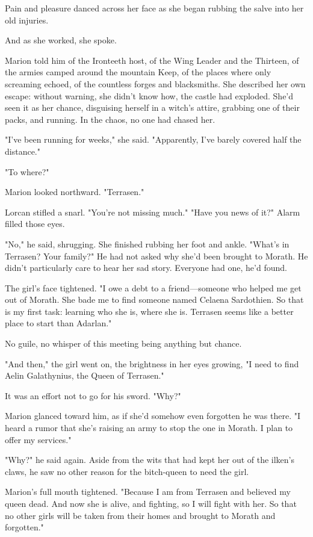 Pain and pleasure danced across her face as she began rubbing the salve into her old injuries.

And as she worked, she spoke.

Marion told him of the Ironteeth host, of the Wing Leader and the Thirteen, of the armies camped around the mountain Keep, of the places where only screaming echoed, of the countless forges and blacksmiths.
She described her own escape: without warning, she didn't know how, the castle had exploded.
She'd seen it as her chance, disguising herself in a witch's attire, grabbing one of their packs, and running.
In the chaos, no one had chased her.

"I've been running for weeks," she said.
"Apparently, I've barely covered half the distance."

"To where?"

Marion looked northward.
"Terrasen."

Lorcan stifled a snarl.
"You're not missing much."
"Have you news of it?"
Alarm filled those eyes.

"No," he said, shrugging.
She finished rubbing her foot and ankle.
"What's in Terrasen?
Your family?"
He had not asked why she'd been brought to Morath.
He didn't particularly care to hear her sad story.
Everyone had one, he'd found.

The girl's face tightened.
"I owe a debt to a friend---someone who helped me get out of Morath.
She bade me to find someone named Celaena Sardothien.
So that is my first task: learning who she is, where she is.
Terrasen seems like a better place to start than Adarlan."

No guile, no whisper of this meeting being anything but chance.

"And then," the girl went on, the brightness in her eyes growing, "I need to find Aelin Galathynius, the Queen of Terrasen."

It was an effort not to go for his sword.
"Why?"

Marion glanced toward him, as if she'd somehow even forgotten he was there.
"I heard a rumor that she's raising an army to stop the one in Morath.
I plan to offer my services."

"Why?"
he said again.
Aside from the wits that had kept her out of the ilken's claws, he saw no other reason for the bitch-queen to need the girl.

Marion's full mouth tightened.
"Because I am from Terrasen and believed my queen dead.
And now she is alive, and fighting, so I will fight with her.
So that no other girls will be taken from their homes and brought to Morath and forgotten."

